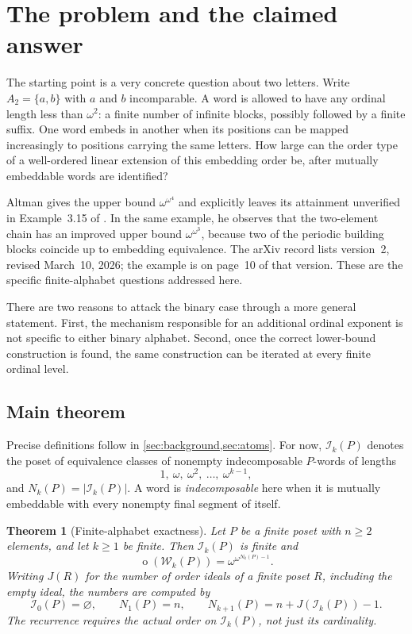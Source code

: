 \documentclass[11pt,letterpaper]{article}
\newtheorem{theorem}{Theorem}[section]
\theoremstyle{definition}
\theoremstyle{remark}
\newcommand{\W}{\mathcal W}
\newcommand{\I}{\mathcal I}
\newcommand{\otp}{\operatorname{o}}
\begin{document}
\section{The problem and the claimed answer}\label{sec:intro}

The starting point is a very concrete question about two letters.
Write $A_2=\{a,b\}$ with $a$ and $b$ incomparable. A word is allowed to have
any ordinal length less than $\omega^2$: a finite number of infinite blocks,
possibly followed by a finite suffix. One word embeds in another when its
positions can be mapped increasingly to positions carrying the same letters.
How large can the order type of a well-ordered linear extension of this
embedding order be, after mutually embeddable words are identified?

Altman gives the upper bound $\omega^{\omega^4}$ and explicitly leaves its
attainment unverified in Example~3.15 of \cite{Altman}. In the same example,
he observes that the two-element chain has an improved upper bound
$\omega^{\omega^3}$, because two of the periodic building blocks coincide
up to embedding equivalence. The arXiv record lists version~2, revised
March~10, 2026; the example is on page~10 of that version. These are the
specific finite-alphabet questions addressed here.

There are two reasons to attack the binary case through a more general
statement. First, the mechanism responsible for an additional ordinal
exponent is not specific to either binary alphabet. Second, once the
correct lower-bound construction is found, the same construction can be
iterated at every finite ordinal level.

\subsection{Main theorem}

Precise definitions follow in \cref{sec:background,sec:atoms}. For now,
$\I_k(P)$ denotes the poset of equivalence classes of nonempty
indecomposable $P$-words of lengths
\[
  1,\ \omega,\ \omega^2,\ \ldots,\ \omega^{k-1},
\]
and $N_k(P)=|\I_k(P)|$. A word is \emph{indecomposable} here when it is
mutually embeddable with every nonempty final segment of itself.

\begin{theorem}[Finite-alphabet exactness]\label{thm:main}
Let $P$ be a finite poset with $n\ge2$ elements, and let $k\ge1$ be finite.
Then $\I_k(P)$ is finite and
\begin{equation}\label{eq:main}
  \boxed{\otp(\W_k(P))=\omega^{\omega^{N_k(P)-1}}.}
\end{equation}
Writing $J(R)$ for the number of order ideals of a finite poset $R$,
including the empty ideal, the numbers are computed by
\begin{equation}\label{eq:recurrence-intro}
  \I_0(P)=\varnothing,\qquad N_1(P)=n,\qquad
  N_{k+1}(P)=n+J(\I_k(P))-1.
\end{equation}
The recurrence requires the actual order on $\I_k(P)$, not just its cardinality.
\end{theorem}
\end{document}
